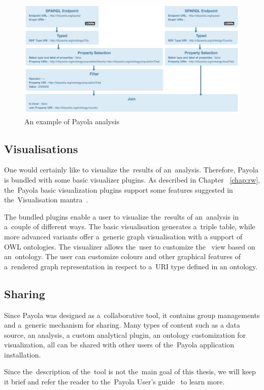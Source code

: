 \begin{figure}
	\centering
	\includegraphics[width=150mm]{images/example-analysis.png}
	\caption{An example of Payola analysis}
	\label{fig:example-analysis}
\end{figure}

\subsection{Visualisations}
One would certainly like to visualize the~results of an~analysis. Therefore, 
Payola is bundled with some basic visualizer plugins. As described
in Chapter ~\ref{chap:rw}, the~Payola basic visualization 
plugins support some features suggested in the~Visualisation 
mantra~\cite{mantra}.

The bundled plugins enable a user to visualize the~results of an~analysis 
in a~couple of different ways. The basic visualisation generates a~triple 
table, while more advanced variants offer a~generic graph visualisation with a 
support of OWL ontologies. The visualizer allows the~user to customize the~
view based on an~ontology. The user can customize colours and other graphical 
features of a~rendered graph representation in respect to a~URI type defined in 
an ontology.

\subsection{Sharing}
Since Payola was designed as a~collaborative tool, it contains group 
managements and a~generic mechanism for sharing. Many types of content such as a 
data source, an analysis, a custom analytical plugin, an ontology customization for 
visualization, all can be shared with other users of the~Payola application 
installation.

Since the~description of the~tool is not the~main goal of this thesis, we will 
keep it brief and refer the reader to the~Payola User's guide~\cite{payola:ug} to learn more.

